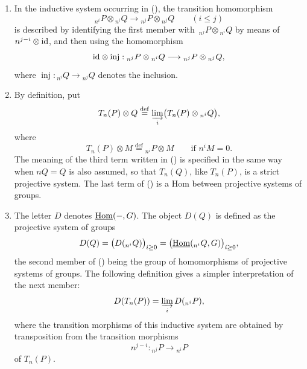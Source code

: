 \begin{enumerate}[label=\alph*)]
\item In the inductive system occurring in (), the transition
homomorphism
\[
 {}_{n^i}P\otimes{}_{n^i}Q
 \longrightarrow
 {}_{n^j}P\otimes{}_{n^j}Q
 \qquad(i\leq j)
\]
is described by identifying the first member with
$\,{}_{n^j}P\otimes{}_{n^i}Q$ by means of
$n^{j-i}\otimes\mathrm{id}$, and then using the homomorphism
\[
 \mathrm{id}\otimes\operatorname{inj}:
 {}_{n^j}P\otimes{}_{n^i}Q
 \longrightarrow
 {}_{n^j}P\otimes{}_{n^j}Q,
\]
where
$\operatorname{inj}:{}_{n^i}Q\longrightarrow{}_{n^j}Q$
denotes the inclusion.

\item By definition, put
\[
 T_n(P)\otimes Q
 \overset{\mathrm{def}}{=}
 \varinjlim_i\bigl(T_n(P)\otimes{}_{n^i}Q\bigr),
\]
where
\[
 T_n(P)\otimes M
 \overset{\mathrm{def}}{=}
 {}_{n^i}P\otimes M
 \qquad\text{if }n^iM=0.
\]
The meaning of the third term written in () is specified in the
same way when $nQ=Q$ is also assumed, so that $T_n(Q)$, like
$T_n(P)$, is a strict projective system.  The last term of () is
a Hom between projective systems of groups.

\item The letter $D$ denotes $\uHom(-,G)$.  The object $D(Q)$ is
defined as the projective system of groups
\[
 D(Q)=\bigl(D({}_{n^i}Q)\bigr)_{i\geq0}
 =\bigl(\uHom({}_{n^i}Q,G)\bigr)_{i\geq0},
\]
the second member of () being the group of homomorphisms of
projective systems of groups.  The following definition gives a
simpler interpretation of the next member:
\[
 D(T_n(P))=\varinjlim_iD({}_{n^i}P),
\]
where the transition morphisms of this inductive system are obtained
by transposition from the transition morphisms
\[
 n^{j-i}:{}_{n^j}P\longrightarrow{}_{n^i}P
\]
of $T_n(P)$.
\end{enumerate}


